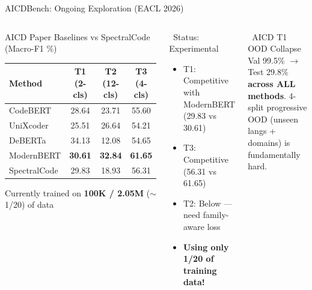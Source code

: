 \documentclass[aspectratio=169, 10pt]{beamer}
\begin{document}
\begin{frame}{AICDBench: Ongoing Exploration (EACL 2026)}
\vspace{-0.2cm}
\begin{columns}[T]
\begin{block}{AICD Paper Baselines vs SpectralCode (Macro-F1 \%)}
\centering\footnotesize
\begin{tabular}{lccc}
\toprule
\textbf{Method} & \textbf{T1} {\tiny(2-cls)} & \textbf{T2} {\tiny(12-cls)} & \textbf{T3} {\tiny(4-cls)} \\
\midrule
CodeBERT & 28.64 & 23.71 & 55.60 \\
UniXcoder & 25.51 & 26.64 & 54.21 \\
DeBERTa & 34.13 & 12.08 & 54.65 \\
ModernBERT & \textbf{30.61} & \textbf{32.84} & \textbf{61.65} \\
\midrule
\rowcolor{oursgreen}
SpectralCode & 29.83 & 18.93 & 56.31 \\
\bottomrule
\end{tabular}

\vspace{3pt}
{\tiny Currently trained on \textbf{100K / 2.05M} ($\sim$1/20) of data}
\end{block}

\begin{alertblock}{\faClock\ Status: Experimental}
\small
\begin{itemize}\setlength\itemsep{2pt}
    \item T1: Competitive with ModernBERT (29.83 vs 30.61)
    \item T3: Competitive (56.31 vs 61.65)
    \item T2: Below --- need family-aware loss
    \item[\faArrowRight] \textbf{Using only 1/20 of training data!}
\end{itemize}
\end{alertblock}

\begin{block}{\scriptsize \faExclamationTriangle\ AICD T1 OOD Collapse}
\scriptsize
Val 99.5\% $\to$ Test 29.8\% \textbf{across ALL methods}. 4-split progressive OOD (unseen langs + domains) is fundamentally hard.
\end{block}
\end{columns}
\end{frame}


\end{document}
